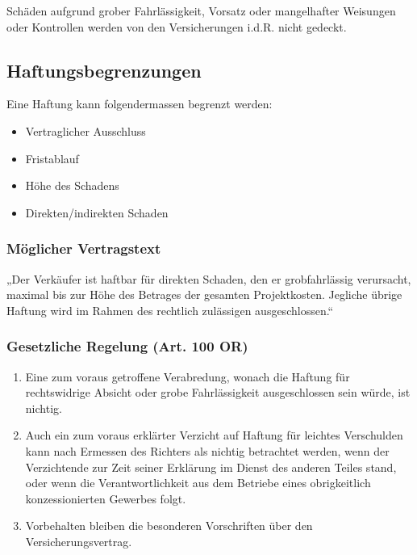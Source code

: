 Schäden aufgrund grober Fahrlässigkeit, Vorsatz oder mangelhafter Weisungen oder
Kontrollen werden von den Versicherungen i.d.R. nicht gedeckt.

\subsection{Haftungsbegrenzungen}
Eine Haftung kann folgendermassen begrenzt werden:
\begin{itemize}
	\tightlist
	\item Vertraglicher Ausschluss
	\item Fristablauf
	\item Höhe des Schadens
	\item Direkten/indirekten Schaden
\end{itemize}

\subsubsection{Möglicher Vertragstext}
„Der Verkäufer ist haftbar für direkten Schaden, den
er grobfahrlässig verursacht, maximal bis zur Höhe
des Betrages der gesamten Projektkosten. Jegliche
übrige Haftung wird im Rahmen des rechtlich
zulässigen ausgeschlossen.“

\subsubsection{Gesetzliche Regelung (Art. 100 OR)}
\begin{enumerate}
	\item Eine zum voraus getroffene Verabredung, wonach die Haftung für
	rechtswidrige Absicht oder grobe Fahrlässigkeit ausgeschlossen sein würde,
	ist nichtig.
	\item Auch ein zum voraus erklärter Verzicht auf Haftung für leichtes Verschulden
	kann nach Ermessen des Richters als nichtig betrachtet werden, wenn der
	Verzichtende zur Zeit seiner Erklärung im Dienst des anderen Teiles stand, oder
	wenn die Verantwortlichkeit aus dem Betriebe eines obrigkeitlich
	konzessionierten Gewerbes folgt.
	\item Vorbehalten bleiben die besonderen Vorschriften über den
	Versicherungsvertrag.
\end{enumerate}
